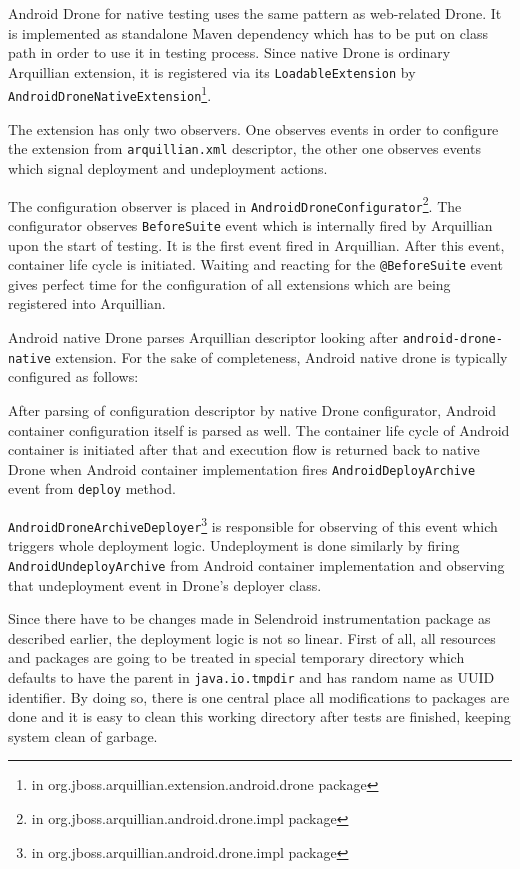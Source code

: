 \documentclass[12pt,final,oneside]{fithesis}
\begin{document}
Android Drone for native testing uses the same pattern as web-related Drone. It is implemented as standalone Maven dependency which has to be put on class path in order to use it in testing process. Since native Drone is ordinary Arquillian extension, it is registered via its \texttt{LoadableExtension} by \texttt{AndroidDroneNativeExtension}\footnote{in org.jboss.arquillian.extension.android.drone package}.

The extension has only two observers. One observes events in order to configure the extension from \texttt{arquillian.xml} descriptor, the other one observes events which signal deployment and undeployment actions.

The configuration observer is placed in \texttt{AndroidDroneConfigurator}\footnote{in org.jboss.arquillian.android.drone.impl package}. The configurator observes \texttt{BeforeSuite} event which is internally fired by Arquillian upon the start of testing. It is the first event fired in Arquillian. After this event, container life cycle is initiated. Waiting and reacting for the \texttt{@BeforeSuite} event gives perfect time for the configuration of all extensions which are being registered into Arquillian.

Android native Drone parses Arquillian descriptor looking after \texttt{android-drone-native} extension. For the sake of completeness, Android native drone is typically configured as follows:



After parsing of configuration descriptor by native Drone configurator, Android container configuration itself is parsed as well. The container life cycle of Android container is initiated after that and execution flow is returned back to native Drone when Android container implementation fires \texttt{AndroidDeployArchive} event from \texttt{deploy} method. 

\texttt{AndroidDroneArchiveDeployer}\footnote{in org.jboss.arquillian.android.drone.impl package} is responsible for observing of this event which triggers whole deployment logic. Undeployment is done similarly by firing \texttt{AndroidUndeployArchive} from Android container implementation and observing that undeployment event in Drone's deployer class.

Since there have to be changes made in Selendroid instrumentation package as described earlier, the deployment logic is not so linear. First of all, all resources and packages are going to be treated in special temporary directory which defaults to have the parent in \texttt{java.io.tmpdir} and has random name as UUID identifier. By doing so, there is one central place all modifications to packages are done and it is easy to clean this working directory after tests are finished, keeping system clean of garbage.
\end{document}
